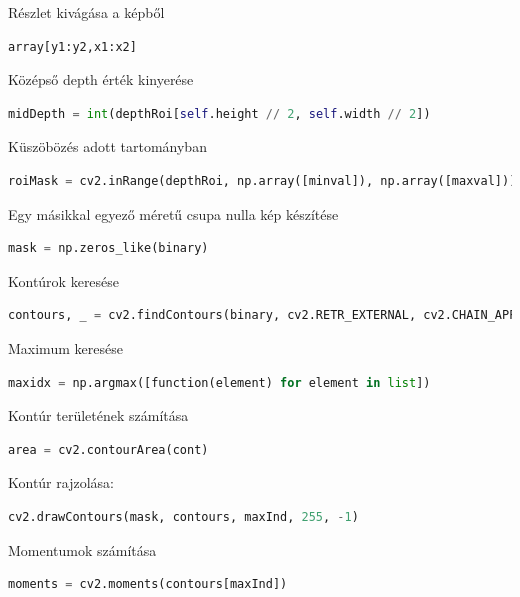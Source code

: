 \documentclass[12pt,a4paper,oneside]{report}             %
\begin{document}
Részlet kivágása a képből

\begin{lstlisting}[language=Python]
array[y1:y2,x1:x2]
\end{lstlisting}

Középső depth érték kinyerése

\begin{lstlisting}[language=Python]
midDepth = int(depthRoi[self.height // 2, self.width // 2])
\end{lstlisting}

Küszöbözés adott tartományban

\begin{lstlisting}[language=Python]
roiMask = cv2.inRange(depthRoi, np.array([minval]), np.array([maxval]))
\end{lstlisting}

Egy másikkal egyező méretű csupa nulla kép készítése

\begin{lstlisting}[language=Python]
mask = np.zeros_like(binary)
\end{lstlisting}

Kontúrok keresése

\begin{lstlisting}[language=Python]
contours, _ = cv2.findContours(binary, cv2.RETR_EXTERNAL, cv2.CHAIN_APPROX_SIMPLE)
\end{lstlisting}

Maximum keresése

\begin{lstlisting}[language=Python]
maxidx = np.argmax([function(element) for element in list])
\end{lstlisting}

Kontúr területének számítása

\begin{lstlisting}[language=Python]
area = cv2.contourArea(cont)
\end{lstlisting}

Kontúr rajzolása:

\begin{lstlisting}[language=Python]
cv2.drawContours(mask, contours, maxInd, 255, -1)
\end{lstlisting}

Momentumok számítása

\begin{lstlisting}[language=Python]
moments = cv2.moments(contours[maxInd])
\end{lstlisting}
\end{document}
